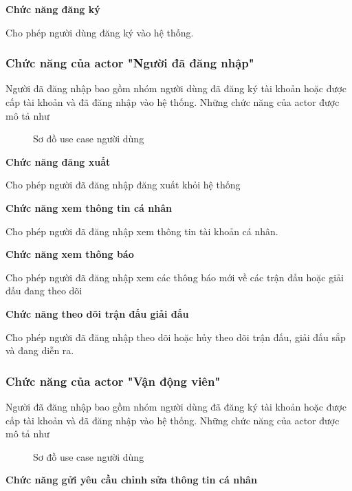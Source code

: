\noindent
\textbf{Chức năng đăng ký}

Cho phép người dùng đăng ký vào hệ thống.

\subsubsection{Chức năng của actor "Người đã đăng nhập"}
Người đã đăng nhập bao gồm nhóm người dùng đã đăng ký tài khoản hoặc được cấp tài khoản và đã đăng nhập vào hệ thống.
Những chức năng của actor được mô tả như

\begin{figure}[H]
  \centering
  
  \caption{Sơ đồ use case người dùng}
  \label{fig:uc-3}
\end{figure}

\noindent
\textbf{Chức năng đăng xuất}

Cho phép người đã đăng nhập đăng xuất khỏi hệ thống

\noindent
\textbf{Chức năng xem thông tin cá nhân}

Cho phép người đã đăng nhập xem thông tin tài khoản cá nhân.

\noindent
\textbf{Chức năng xem thông báo}

Cho phép người đã đăng nhập xem các thông báo mới về các trận đấu hoặc giải đấu đang theo dõi

\noindent
\textbf{Chức năng theo dõi trận đấu giải đấu}

Cho phép người đã đăng nhập theo dõi hoặc hủy theo dõi trận đấu, giải đấu sắp và đang diễn ra.



\subsubsection{Chức năng của actor "Vận động viên"}
Người đã đăng nhập bao gồm nhóm người dùng đã đăng ký tài khoản hoặc được cấp tài khoản và đã đăng nhập vào hệ thống.
Những chức năng của actor được mô tả như

\begin{figure}[H]
  \centering
  
  \caption{Sơ đồ use case người dùng}
  \label{fig:uc-4}
\end{figure}


\noindent
\textbf{Chức năng gửi yêu cầu chỉnh sửa thông tin cá nhân}

